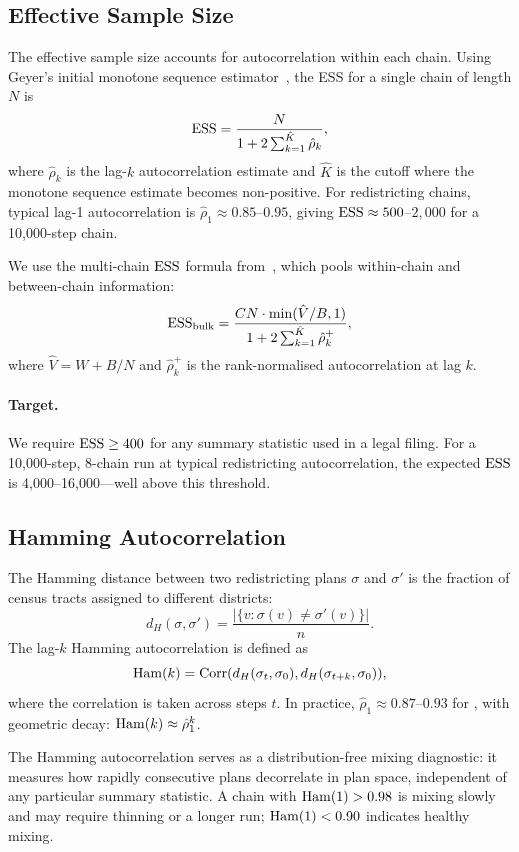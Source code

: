 \subsection{Effective Sample Size}

The effective sample size accounts for autocorrelation within each chain.
Using Geyer's initial monotone sequence estimator~\citep{geyer1992practical},
the ESS for a single chain of length $N$ is
\[
  \mathrm{ESS} = \frac{N}{1 + 2\sum_{k=1}^{\hat{K}} \hat{\rho}_k},
\]
where $\hat{\rho}_k$ is the lag-$k$ autocorrelation estimate and
$\hat{K}$ is the cutoff where the monotone sequence estimate becomes
non-positive.
For redistricting chains, typical lag-1 autocorrelation is
$\hat{\rho}_1 \approx 0.85$--$0.95$, giving
$\mathrm{ESS} \approx 500$--$2{,}000$ for a 10{,}000-step chain.

We use the multi-chain $\mathrm{ESS}$ formula from~\citet{vehtari2021rank}, which
pools within-chain and between-chain information:
\[
  \mathrm{ESS}_{\text{bulk}} = \frac{CN \cdot \min(\hat{V}/B, 1)}{1 + 2\sum_{k=1}^{\hat{K}}\hat{\rho}_k^+},
\]
where $\hat{V} = W + B/N$ and $\hat{\rho}_k^+$ is the rank-normalised
autocorrelation at lag $k$.

\paragraph{Target.}
We require $\mathrm{ESS} \geq 400$ for any summary statistic used in a legal
filing.
For a 10{,}000-step, 8-chain run at typical redistricting autocorrelation,
the expected $\mathrm{ESS}$ is 4{,}000--16{,}000---well above this threshold.

\subsection{Hamming Autocorrelation}

The Hamming distance between two redistricting plans $\sigma$ and $\sigma'$
is the fraction of census tracts assigned to different districts:
\[
  d_H(\sigma, \sigma') = \frac{|\{v : \sigma(v) \neq \sigma'(v)\}|}{n}.
\]
The lag-$k$ Hamming autocorrelation is defined as
\[
  \mathrm{Ham}(k) = \mathrm{Corr}(d_H(\sigma_t, \sigma_0), d_H(\sigma_{t+k}, \sigma_0)),
\]
where the correlation is taken across steps $t$.
In practice, $\hat{\rho}_1 \approx 0.87$--$0.93$ for \recom{}, with
geometric decay: $\mathrm{Ham}(k) \approx \hat{\rho}_1^k$.

The Hamming autocorrelation serves as a distribution-free mixing
diagnostic: it measures how rapidly consecutive plans decorrelate in
plan space, independent of any particular summary statistic.
A chain with $\mathrm{Ham}(1) > 0.98$ is mixing slowly and may require
thinning or a longer run; $\mathrm{Ham}(1) < 0.90$ indicates healthy mixing.

